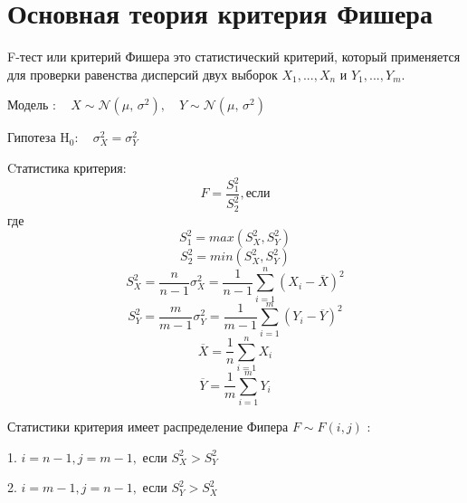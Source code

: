 \documentclass[12pt]{disser}
\begin{document}
\section*{Основная теория критерия Фишера}
F-тест или критерий Фишера это статистический критерий, который применяется для проверки равенства дисперсий двух выборок $X_1,...,X_n$ и $Y_1,...,Y_m$.

Модель $:\quad X \sim \mathcal{N}(\mu,\,\sigma^{2}),\quad Y \sim \mathcal{N}(\mu,\,\sigma^{2})$ 

Гипотеза $\mathrm{H}_{0}: \quad \sigma_{X}^{2}=\sigma_{Y}^{2}$

Cтатистика критерия:
\begin{equation*}
	F = \frac{S_1^2}{S_2^2}, если  
\end{equation*}
где
\begin{equation*}
	S_1^2= max(S_X^2, S_Y^2)
\end{equation*}
\begin{equation*}
	S_2^2= min(S_X^2, S_Y^2)
\end{equation*}
\begin{equation*}
	S_X^2 = \frac{n}{n - 1} \sigma_X^2=\frac{1}{n-1}\sum_{i=1}^n \left(X_i - \overline{X}\right)^2
\end{equation*}
\begin{equation*}
	S_Y^2 = \frac{m}{m - 1} \sigma_Y^2=\frac{1}{m-1}\sum_{i=1}^m \left(Y_i - \overline{Y}\right)^2
\end{equation*}
\begin{equation*}
	\overline{X} = \frac{1}{n}\sum_{i=1}^n X_i
\end{equation*}
\begin{equation*}
	\overline{Y} = \frac{1}{m}\sum_{i=1}^m Y_i
\end{equation*}

Статистики критерия имеет распределение Фипера $F \sim F(i, j)$ :

1. $i=n-1, j=m-1,$ если $S_{X}^{2}>S_{Y}^{2}$

2. $i=m-1, j=n-1,$ если $S_{Y}^{2}>S_{X}^{2}$
\end{document}
